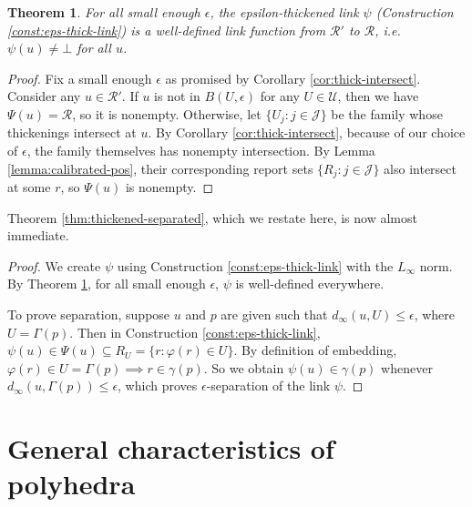 \documentclass[11pt]{article}
\newcommand{\reals}{\mathbb{R}}
\newcommand{\R}{\mathcal{R}}
\newcommand{\U}{\mathcal{U}}
\newcommand{\Y}{\mathcal{Y}}
\newtheorem{theorem}{Theorem}
\begin{document}
\begin{theorem} \label{thm:small-eps-thick}
  For all small enough $\epsilon$, the epsilon-thickened link $\psi$ (Construction \ref{const:eps-thick-link}) is a well-defined link function from $\R'$ to $\R$, i.e. $\psi(u) \neq \bot$ for all $u$.
\end{theorem}
\begin{proof}
  Fix a small enough $\epsilon$ as promised by Corollary \ref{cor:thick-intersect}.
  Consider any $u \in \R'$.
  If $u$ is not in $B(U,\epsilon)$ for any $U \in \U$, then we have $\Psi(u) = \R$, so it is nonempty.
  Otherwise, let $\{U_j : j \in \mathcal{J}\}$ be the family whose thickenings intersect at $u$.
  By Corollary \ref{cor:thick-intersect}, because of our choice of $\epsilon$, the family themselves has nonempty intersection.
  By Lemma \ref{lemma:calibrated-pos}, their corresponding report sets $\{R_j : j \in \mathcal{J}\}$ also intersect at some $r$, so $\Psi(u)$ is nonempty.
\end{proof}

Theorem \ref{thm:thickened-separated}, which we restate here, is now almost immediate.
\thickenedseparated*
\begin{proof}
  We create $\psi$ using Construction \ref{const:eps-thick-link} with the $L_{\infty}$ norm.
  By Theorem \ref{thm:small-eps-thick}, for all small enough $\epsilon$, $\psi$ is well-defined everywhere.

  To prove separation, suppose $u$ and $p$ are given such that $d_{\infty}(u,U) \leq \epsilon$, where $U = \Gamma(p)$.
  Then in Construction \ref{const:eps-thick-link}, $\psi(u) \in \Psi(u) \subseteq R_U = \{r : \varphi(r) \in U\}$.
  By definition of embedding, $\varphi(r) \in U = \Gamma(p) \implies r \in \gamma(p)$.
  So we obtain $\psi(u) \in \gamma(p)$ whenever $d_{\infty}(u,\Gamma(p)) \leq \epsilon$, which proves $\epsilon$-separation of the link $\psi$.
\end{proof}

\section{General characteristics of polyhedra}
\label{app:polyhedra}
\end{document}
